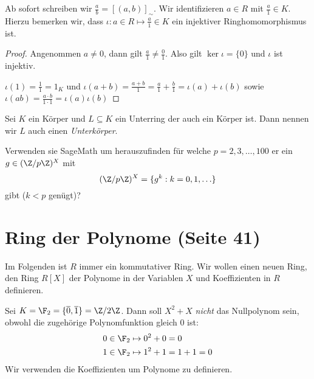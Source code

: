 	Ab sofort schreiben wir $\frac{a}{b} = [(a,b)]_{\sim}$.
	Wir identifizieren $a \in R$ mit $\frac{a}{1} \in K$. Hierzu bemerken wir, dass $\iota: a \in R \mapsto \frac{a}{1} \in K $ ein injektiver Ringhomomorphismus ist.

\begin{proof}
	Angenommen $a\neq 0$, dann gilt $\frac{a}{1} \neq  \frac{0}{1}$.
	Also gilt $\ker \iota = \{0\} $ und $\iota $ ist injektiv.

	$\iota(1) = \frac{1}{1} = 1_{K}$ und $\iota(a+b) = \frac{a+b}{1} = \frac{a}{1} + \frac{b}{1} = \iota(a) + \iota(b)$ sowie
	$\iota(ab) = \frac{a\cdot b}{1\cdot 1} = \iota(a) \iota(b)$
\end{proof}

\begin{definition}
	Sei $K$ ein Körper und $L \subseteq K$ ein Unterring der auch ein Körper ist. Dann nennen wir $L$ auch einen \emph{Unterkörper}.
\end{definition}

\begin{ex}
	Verwenden sie SageMath um herauszufinden für welche $p=2,3,\ldots,100$ er ein $g \in (\Z / p \Z)^{X}$ mit
	\[
		(\Z / p \Z)^{X} = \{g^{k} : k = 0,1,\ldots\} 
	\]
	gibt ($k < p$ genügt)?
\end{ex}

\section{Ring der Polynome (Seite 41)}
Im Folgenden ist $R$ immer ein kommutativer Ring. Wir wollen einen neuen Ring, den Ring $R[X]$ der Polynome
in der Variablen $X$ und Koeffizienten in $R$ definieren.

\begin{eg}
	Sei $K = \F_{2} = \{\overline{0},\overline{1}\} = \Z / 2\Z$. Dann soll $X^2+ X $ \emph{nicht} das Nullpolynom sein,
	obwohl die zugehörige Polynomfunktion gleich $0$ ist: 
	\begin{align*}
		&0 \in \F_{2} \mapsto 0^2 + 0 = 0\\ 
		&1 \in \F_{2} \mapsto 1^2 + 1 = 1+1 = 0
	\end{align*}
	Wir verwenden die Koeffizienten um Polynome zu definieren.
\end{eg}

